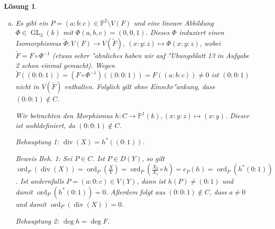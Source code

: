 \documentclass[a4paper, 12pt, numbers=noendperiod, chapterprefix=true, headsepline]{scrbook}
\theoremstyle{break}
\newtheorem{Loes}{L\"osung}
\theoremstyle{nonumberbreak}
\theoremstyle{nonumberplain}
\DeclareMathOperator{\GL}{GL}
\DeclareMathOperator{\Divisor}{div}
\DeclareMathOperator{\ord}{ord}
\newcommand{\IP}{\mathbb{P}}%
\begin{document}
\begin{Loes}
\begin{enumerate}[a)]
\begin{figure}[htbp]
		\caption{$C\cap D(Y)$ mit $V(Z)$ ($x$-Achse).}
		\label{fig:DY}
	\end{figure}
	
\item
	Es gibt ein $P =(a:b:c)\in \IP^2\setminus V(F)$ und eine lineare Abbildung $\Phi \in \GL_3(k)$ mit $\Phi(a,b,c) = (0,0,1)$. Dieses $\Phi$ induziert einen Isomorphismus $\tilde{\Phi} \colon V(F) \to V(\tilde{F})$, $(x:y:z) \mapsto \Phi(x:y:z)$, wobei $\tilde{F} = F \circ \Phi^{-1}$ (etwas sehrr "ahnliches haben wir auf "Ubungsblatt 13 in Aufgabe 2 schon einmal gemacht). Wegen $\tilde{F}((0:0:1)) = (F \circ \Phi^{-1})((0:0:1)) = F((a:b:c)) \neq 0$ ist $(0:0:1)$ nicht in $V(\tilde{F})$ enthalten. Folglich gilt ohne Einschr"ankung, dass $(0:0:1) \notin C$.

	Wir betrachten den Morphismus $h: C \to \IP^1(k), (x:y:z) \mapsto(x:y)$. Dieser ist wohldefiniert, da $(0:0:1) \notin C$.

	\emph{Behauptung 1:} $\Divisor(X) = h^\ast((0:1))$.

	\emph{Beweis Beh. 1:} Sei $P\in C$. Ist $P \in D(Y)$, so gilt $\ord_P(\Divisor(X)) = \ord_P(\frac{X}{Y}) = \ord_P(\frac{X_0}{X_1} \circ h) = e_P(h) = \ord_P(h^\ast(0:1))$. Ist andernfalls $P = (a:0:c) \in V(Y)$, dann ist $h(P) \neq (0:1)$ und damit $\ord_P(h^\ast(0:1)) = 0$. A\ss erdem folgt aus $(0:0:1)\notin C$, dass $a \neq 0$ und damit $\ord_P(\Divisor(X)) = 0$.

	\emph{Behauptung 2:} $\deg h = \deg F$. 


\end{enumerate}
\end{Loes}
\end{document}
